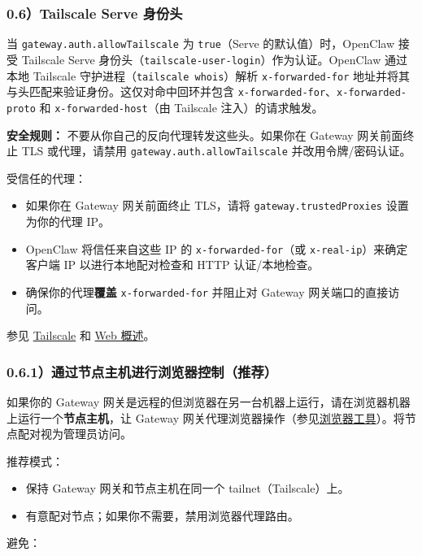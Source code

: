 \subsubsection{0.6）Tailscale Serve 身份头}


当 \texttt{gateway.auth.allowTailscale} 为 \texttt{true}（Serve 的默认值）时，OpenClaw 接受 Tailscale Serve 身份头（\texttt{tailscale-user-login}）作为认证。OpenClaw 通过本地 Tailscale 守护进程（\texttt{tailscale whois}）解析 \texttt{x-forwarded-for} 地址并将其与头匹配来验证身份。这仅对命中回环并包含 \texttt{x-forwarded-for}、\texttt{x-forwarded-proto} 和 \texttt{x-forwarded-host}（由 Tailscale 注入）的请求触发。

\textbf{安全规则：} 不要从你自己的反向代理转发这些头。如果你在 Gateway 网关前面终止 TLS 或代理，请禁用 \texttt{gateway.auth.allowTailscale} 并改用令牌/密码认证。

受信任的代理：

\begin{itemize}
  \item 如果你在 Gateway 网关前面终止 TLS，请将 \texttt{gateway.trustedProxies} 设置为你的代理 IP。
  \item OpenClaw 将信任来自这些 IP 的 \texttt{x-forwarded-for}（或 \texttt{x-real-ip}）来确定客户端 IP 以进行本地配对检查和 HTTP 认证/本地检查。
  \item 确保你的代理\textbf{覆盖} \texttt{x-forwarded-for} 并阻止对 Gateway 网关端口的直接访问。
\end{itemize}


参见 \href{/gateway/tailscale}{Tailscale} 和 \href{/web}{Web 概述}。

\subsubsection{0.6.1）通过节点主机进行浏览器控制（推荐）}


如果你的 Gateway 网关是远程的但浏览器在另一台机器上运行，请在浏览器机器上运行一个\textbf{节点主机}，让 Gateway 网关代理浏览器操作（参见\href{/tools/browser}{浏览器工具}）。将节点配对视为管理员访问。

推荐模式：

\begin{itemize}
  \item 保持 Gateway 网关和节点主机在同一个 tailnet（Tailscale）上。
  \item 有意配对节点；如果你不需要，禁用浏览器代理路由。
\end{itemize}


避免：

